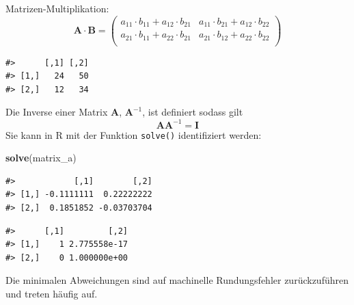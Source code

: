 \documentclass[]{tufte-book}
\newenvironment{Shaded}{}{}
\newcommand{\KeywordTok}[1]{\textcolor[rgb]{0.00,0.44,0.13}{\textbf{#1}}}
\newcommand{\StringTok}[1]{\textcolor[rgb]{0.25,0.44,0.63}{#1}}
\newcommand{\OperatorTok}[1]{\textcolor[rgb]{0.40,0.40,0.40}{#1}}
\newcommand{\NormalTok}[1]{#1}
\begin{document}
Matrizen-Multiplikation: \[\boldsymbol{A}\cdot\boldsymbol{B}=
\left(
\begin{array}{rrr}                                
a_{11}\cdot b_{11} + a_{12}\cdot b_{21} & a_{11}\cdot b_{21}+a_{12}\cdot b_{22}\\                     a_{21}\cdot b_{11} + a_{22}\cdot b_{21} & a_{21}\cdot b_{12}+a_{22}\cdot b_{22}\\                     
\end{array}
\right)\]

\begin{Shaded}
\end{Shaded}

\begin{verbatim}
#>      [,1] [,2]
#> [1,]   24   50
#> [2,]   12   34
\end{verbatim}

Die Inverse einer Matrix \(\boldsymbol{A}\), \(\boldsymbol{A}^{-1}\),
ist definiert sodass gilt
\[\boldsymbol{A}\boldsymbol{A}^{-1}=\boldsymbol{I}\] Sie kann in R mit
der Funktion \texttt{solve()} identifiziert werden:

\begin{Shaded}
\begin{Highlighting}[]
\KeywordTok{solve}\NormalTok{(matrix_a)}
\end{Highlighting}
\end{Shaded}

\begin{verbatim}
#>            [,1]        [,2]
#> [1,] -0.1111111  0.22222222
#> [2,]  0.1851852 -0.03703704
\end{verbatim}

\begin{Shaded}
\end{Shaded}

\begin{verbatim}
#>      [,1]         [,2]
#> [1,]    1 2.775558e-17
#> [2,]    0 1.000000e+00
\end{verbatim}

Die minimalen Abweichungen sind auf machinelle Rundungsfehler
zurückzuführen und treten häufig auf.
\end{document}
